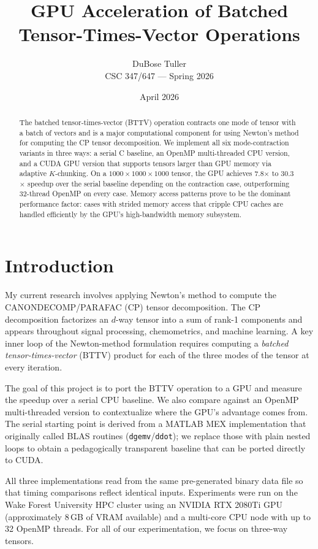 \documentclass[11pt]{article}
\title{\textbf{GPU Acceleration of Batched Tensor-Times-Vector Operations}}
\author{DuBose Tuller\\CSC 347/647 --- Spring 2026}
\date{April 2026}
\begin{document}
\maketitle

\begin{abstract}
The batched tensor-times-vector (BTTV) operation contracts one mode of tensor with a batch of vectors and is a major computational
component for using Newton's method for computing the CP tensor decomposition.
We implement all six mode-contraction variants in three ways: a serial C
baseline, an OpenMP multi-threaded CPU version, and a CUDA GPU version
that supports tensors larger than GPU memory via adaptive $K$-chunking.
On a $1000\times1000\times1000$ tensor, the GPU achieves 7.8$\times$ to
30.3$\times$ speedup over the serial baseline depending on the contraction
case, outperforming 32-thread OpenMP on every case.
Memory access patterns prove to be the dominant performance factor:
cases with strided memory access that cripple CPU caches are handled
efficiently by the GPU's high-bandwidth memory subsystem.
\end{abstract}

\section{Introduction}

My current research involves applying Newton's method to compute the
CANONDECOMP/PARAFAC (CP) tensor decomposition. The CP decomposition
factorizes an $d$-way tensor into a sum of rank-1 components and appears
throughout signal processing, chemometrics, and machine learning.  A key
inner loop of the Newton-method formulation requires computing a
\emph{batched tensor-times-vector} (BTTV) product for each of the three
modes of the tensor at every iteration.

The goal of this project is to port the BTTV operation to a GPU and
measure the speedup over a serial CPU baseline.  We also compare against
an OpenMP multi-threaded version to contextualize where the GPU's advantage
comes from.  The serial starting point is derived from a MATLAB MEX
implementation that originally called BLAS routines (\texttt{dgemv}/\texttt{ddot});
we replace those with plain nested loops to obtain a pedagogically
transparent baseline that can be ported directly to CUDA.

All three implementations read from the same pre-generated binary data
file so that timing comparisons reflect identical inputs.
Experiments were run on the Wake Forest University HPC cluster using an
NVIDIA RTX 2080Ti GPU (approximately 8\,GB of VRAM available) and a
multi-core CPU node with up to 32 OpenMP threads. For all of our experimentation, we focus on three-way tensors.
\end{document}
